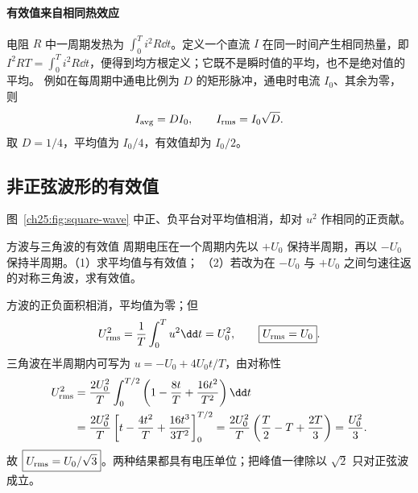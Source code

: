 \paragraph{有效值来自相同热效应}
电阻 $R$ 中一周期发热为 $\int_0^T i^2R\dd t$。定义一个直流 $I$ 在同一时间产生相同热量，即
$I^2RT=\int_0^Ti^2R\dd t$，便得到均方根定义；它既不是瞬时值的平均，也不是绝对值的平均。
例如在每周期中通电比例为 $D$ 的矩形脉冲，通电时电流 $I_0$、其余为零，则
\[
 I_{\rm avg}=DI_0,\qquad I_{\rm rms}=I_0\sqrt D.
\]
取 $D=1/4$，平均值为 $I_0/4$，有效值却为 $I_0/2$。
\subsection{非正弦波形的有效值}


\begin{center}
\label{ch25:fig:square-wave}
\end{center}
图~\ref{ch25:fig:square-wave} 中正、负平台对平均值相消，却对 $u^2$ 作相同的正贡献。

\begin{origexamplebox}{方波与三角波的有效值}
周期电压在一个周期内先以 $+U_0$ 保持半周期，再以 $-U_0$ 保持半周期。（1）求平均值与有效值；
（2）若改为在 $-U_0$ 与 $+U_0$ 之间匀速往返的对称三角波，求有效值。
\end{origexamplebox}
\begin{xesolution}
方波的正负面积相消，平均值为零；但
\[
 U_{\rm rms}^2=\frac1T\int_0^T u^2\dd t=U_0^2,
 \qquad \boxed{U_{\rm rms}=U_0}.
\]
三角波在半周期内可写为 $u=-U_0+4U_0t/T$，由对称性
\begin{align*}
 U_{\rm rms}^2
 &=\frac{2U_0^2}{T}\int_0^{T/2}\left(1-\frac{8t}{T}+\frac{16t^2}{T^2}\right)\dd t\\
 &=\frac{2U_0^2}{T}\left[t-\frac{4t^2}{T}+\frac{16t^3}{3T^2}\right]_0^{T/2}
 =\frac{2U_0^2}{T}\left(\frac T2-T+\frac{2T}{3}\right)=\frac{U_0^2}{3}.
\end{align*}
故 $\boxed{U_{\rm rms}=U_0/\sqrt3}$。两种结果都具有电压单位；把峰值一律除以 $\sqrt2$ 只对正弦波成立。
\end{xesolution}


